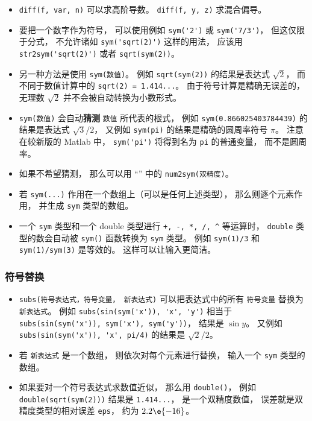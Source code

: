 \begin{itemize}
\item \verb`diff(f, var, n)` 可以求高阶导数。 \verb`diff(f, y, z)` 求混合偏导。

\item  要把一个数字作为符号， 可以使用例如 \verb`sym('2')` 或 \verb`sym('7/3')`， 但这仅限于分式， 不允许诸如 \verb`sym('sqrt(2)')` 这样的用法， 应该用 \verb`str2sym('sqrt(2)')` 或者 \verb`sqrt(sym(2))`。

\item 另一种方法是使用 \verb`sym(数值)`。 例如 \verb`sqrt(sym(2))` 的结果是表达式 $\sqrt 2$， 而不同于数值计算中的 \verb`sqrt(2) = 1.414...`。 由于符号计算是精确无误差的， 无理数 $\sqrt{2}$ 并不会被自动转换为小数形式。

\item  \verb`sym(数值)` 会自动\textbf{猜测} \verb`数值` 所代表的根式， 例如 \verb`sym(0.866025403784439)` 的结果是表达式 $\sqrt{3}/2$， 又例如 \verb`sym(pi)` 的结果是精确的圆周率符号 $\pi$。 注意在较新版的 Matlab 中， \verb`sym('pi')` 将得到名为 \verb`pi` 的普通变量， 而不是圆周率。

\item 如果不希望猜测， 那么可以用 “” 中的 \verb`num2sym(双精度)`。

\item 若 \verb`sym(...)` 作用在一个数组上（可以是任何上述类型）， 那么则逐个元素作用， 并生成 \verb`sym` 类型的数组。

\item 一个 \verb`sym` 类型和一个 double 类型进行 \verb`+, -, *, /, ^` 等运算时， \verb`double` 类型的数会自动被 \verb`sym()` 函数转换为 \verb`sym` 类型。 例如 \verb`sym(1)/3` 和 \verb`sym(1)/sym(3)` 是等效的。 这样可以让输入更简洁。
\end{itemize}

\subsubsection{符号替换}
\begin{itemize}
\item \verb`subs(符号表达式，符号变量， 新表达式)` 可以把表达式中的所有 \verb`符号变量` 替换为 \verb`新表达式`。 例如 \verb`subs(sin(sym('x')), 'x', 'y')` 相当于 \verb`subs(sin(sym('x')), sym('x'), sym('y'))`， 结果是 $\sin y$。 又例如 \verb`subs(sin(sym('x')), 'x', pi/4)` 的结果是 $\sqrt 2/2$。
\item 若 \verb`新表达式` 是一个数组， 则依次对每个元素进行替换， 输入一个 \verb`sym` 类型的数组。
\item 如果要对一个符号表达式求数值近似， 那么用 \verb`double()`， 例如 \verb`double(sqrt(sym(2)))` 结果是 \verb`1.414...`， 是一个双精度数值， 误差就是双精度类型的相对误差 \verb`eps`， 约为 $2.2\e{-16}$。
\end{itemize}

